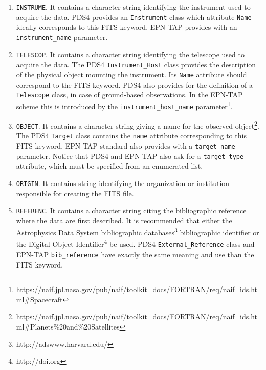 \begin{enumerate}
\item{\texttt{INSTRUME}.
It contains a character string identifying the instrument used to acquire the data.
PDS4 provides an \texttt{Instrument} class which attribute \texttt{Name} ideally 
corresponds to this FITS keyword.
EPN-TAP provides with an \texttt{instrument\_name} parameter.}

\item{\texttt{TELESCOP}.
It contains a character string identifying the telescope used to acquire the data.
The PDS4 \texttt{Instrument\_Host} class provides the description of the physical object
mounting the instrument.
Its \texttt{Name} attribute should correspond to the FITS keyword.
PDS4 also provides for the definition of a \texttt{Telescope} class, in case of
ground-based observations.
In the EPN-TAP scheme this is introduced by the \texttt{instrument\_host\_name}
parameter\footnote{https://naif.jpl.nasa.gov/pub/naif/toolkit\_docs/FORTRAN/req/naif\_ids.html\#Spacecraft}.}

\item{\texttt{OBJECT}.
It contains a character string giving a name for the observed
object\footnote{https://naif.jpl.nasa.gov/pub/naif/toolkit\_docs/FORTRAN/req/naif\_ids.html\#Planets\%20and\%20Satellites}.
The PDS4 \texttt{Target} class contains the \texttt{name} attribute corresponding to
this FITS keyword.
EPN-TAP standard also provides with a \texttt{target\_name} parameter.
Notice that PDS4 and EPN-TAP also ask for a \texttt{target\_type} attribute,
which must be specified from an enumerated list.}

\item{\texttt{ORIGIN}.
It contains string identifying the organization or institution responsible for
creating the FITS file.
\DIFaddbegin {}}

\item{\texttt{REFERENC}.
It contains a character string citing the bibliographic reference where the
data are first described.
It is recommended that either the Astrophysics Data System bibliographic
databases\footnote{http://adswww.harvard.edu/}
bibliographic identifier or the Digital Object Identifier\footnote{http://doi.org}
be used.
PDS4 \texttt{External\_Reference} class and EPN-TAP \texttt{bib\_reference} have
exactly the same meaning and use than the FITS keyword.}

\end{enumerate}

